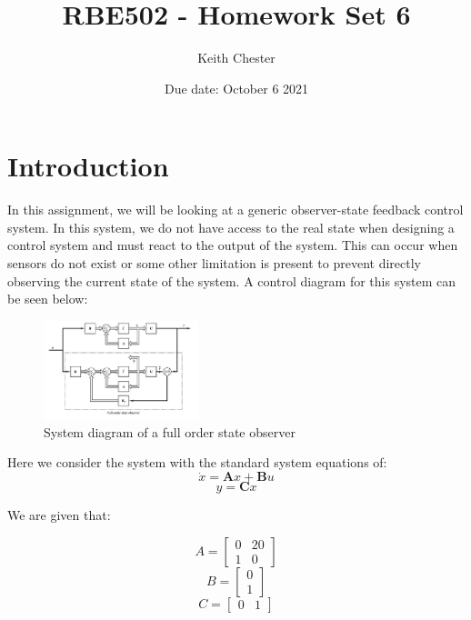 \documentclass{article}
\title{RBE502 - Homework Set 6}
\author{Keith Chester}
\date{Due date: October 6 2021}
\begin{document}
\maketitle

\section*{Introduction}

In this assignment, we will be looking at a generic observer-state feedback control system. In this system, we do not have access to the real state when designing a control system and must react to the output of the system. This can occur when sensors do not exist or some other limitation is present to prevent directly observing the current state of the system. A control diagram for this system can be seen below:

\begin{figure}[H]
    \centering
    \includegraphics[width = 0.4\textwidth]{figures/system_diagram.png}
    \caption{System diagram of a full order state observer}
    \label{fig:system-diagram}
\end{figure}

Here we consider the system with the standard system equations of:
\begin{equation}
    \dot{x} = \boldsymbol{A}x + \boldsymbol{B}u
\end{equation}
\begin{equation}
    y=\boldsymbol{C}x
\end{equation}

We are given that:

\begin{equation}
    A = \begin{bmatrix}
        0 & 20 \\ 1 & 0 
    \end{bmatrix}
\end{equation}
\begin{equation}
    B = \begin{bmatrix}
        0 \\ 1
    \end{bmatrix}
\end{equation}
\begin{equation}
    C = \begin{bmatrix}
        0 & 1
    \end{bmatrix}
\end{equation}
\end{document}
